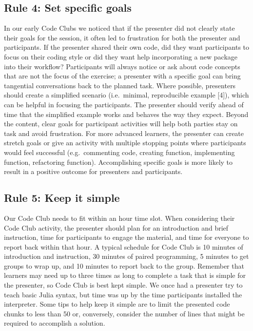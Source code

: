 \documentclass[
  11pt,
]{article}
\begin{document}
\hypertarget{rule-4-set-specific-goals}{%
\subsection{Rule 4: Set specific
goals}\label{rule-4-set-specific-goals}}

In our early Code Clubs we noticed that if the presenter did not clearly
state their goals for the session, it often led to frustration for both
the presenter and participants. If the presenter shared their own code,
did they want participants to focus on their coding style or did they
want help incorporating a new package into their workflow? Participants
will always notice or ask about code concepts that are not the focus of
the exercise; a presenter with a specific goal can bring tangential
conversations back to the planned task. Where possible, presenters
should create a simplified scenario (i.e.~minimal, reproducible example
{[}4{]}), which can be helpful in focusing the participants. The
presenter should verify ahead of time that the simplified example works
and behaves the way they expect. Beyond the content, clear goals for
participant activities will help both parties stay on task and avoid
frustration. For more advanced learners, the presenter can create
stretch goals or give an activity with multiple stopping points where
participants would feel successful (e.g.~commenting code, creating
function, implementing function, refactoring function). Accomplishing
specific goals is more likely to result in a positive outcome for
presenters and participants.

\hypertarget{rule-5-keep-it-simple}{%
\subsection{Rule 5: Keep it simple}\label{rule-5-keep-it-simple}}

Our Code Club needs to fit within an hour time slot. When considering
their Code Club activity, the presenter should plan for an introduction
and brief instruction, time for participants to engage the material, and
time for everyone to report back within that hour. A typical schedule
for Code Club is 10 minutes of introduction and instruction, 30 minutes
of paired programming, 5 minutes to get groups to wrap up, and 10
minutes to report back to the group. Remember that learners may need up
to three times as long to complete a task that is simple for the
presenter, so Code Club is best kept simple. We once had a presenter try
to teach basic Julia syntax, but time was up by the time participants
installed the interpreter. Some tips to help keep it simple are to limit
the presented code chunks to less than 50 or, conversely, consider the
number of lines that might be required to accomplish a solution.
\end{document}
